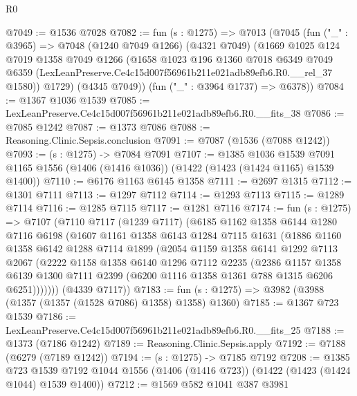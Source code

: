 \begin{lexlean}{R0}
\begin{coremodule}
@7049 := @1536 @7028
@7082 := fun (s : @1275) =>
  @7013
    (@7045
      (fun ("_" : @3965) =>
      @7048
        (@1240 @7049 @1266)
        (@4321 @7049)
        (@1669
          @1025
          @124
          @7019
          @1358
          @7049
          @1266
          (@1658
            @1023
            @196
            @1360
            @7018
            @6349
            @7049
            @6359
            (LexLeanPreserve.Ce4c15d007f56961b211e021adb89efb6.R0.__rel_37 @1580))
          @1729)
        (@4345 @7049))
      (fun ("_" : @3964 @1737) => @6378))
@7084 := @1367 @1036 @1539
@7085 := LexLeanPreserve.Ce4c15d007f56961b211e021adb89efb6.R0.__fits_38
@7086 := @7085 @1242
@7087 := @1373 @7086
@7088 := Reasoning.Clinic.Sepsis.conclusion
@7091 := @7087 (@1536 (@7088 @1242))
@7093 := (s : @1275) -> @7084 @7091
@7107 := @1385
    @1036
    @1539
    @7091
    @1165
    @1556
    (@1406 (@1416 @1036))
    (@1422 (@1423 (@1424 @1165) @1539 @1400))
@7110 := @6176 @1163 @6145 @1358
@7111 := @2697 @1315
@7112 := @1301 @7111
@7113 := @1297 @7112
@7114 := @1293 @7113
@7115 := @1289 @7114
@7116 := @1285 @7115
@7117 := @1281 @7116
@7174 := fun (s : @1275) =>
  @7107
    (@7110
      @7117
      (@1239 @7117)
      (@6185
        @1162
        @1358
        @6144
        @1280
        @7116
        @6198
        (@1607
          @1161
          @1358
          @6143
          @1284
          @7115
          @1631
          (@1886
            @1160
            @1358
            @6142
            @1288
            @7114
            @1899
            (@2054
              @1159
              @1358
              @6141
              @1292
              @7113
              @2067
              (@2222
                @1158
                @1358
                @6140
                @1296
                @7112
                @2235
                (@2386
                  @1157
                  @1358
                  @6139
                  @1300
                  @7111
                  @2399
                  (@6200 @1116 @1358 @1361 @788 @1315 @6206 @6251)))))))
      (@4339 @7117))
@7183 := fun (s : @1275) => @3982 (@3988 (@1357 (@1357 (@1528 @7086) @1358) @1358) @1360)
@7185 := @1367 @723 @1539
@7186 := LexLeanPreserve.Ce4c15d007f56961b211e021adb89efb6.R0.__fits_25
@7188 := @1373 (@7186 @1242)
@7189 := Reasoning.Clinic.Sepsis.apply
@7192 := @7188 (@6279 (@7189 @1242))
@7194 := (s : @1275) -> @7185 @7192
@7208 := @1385
    @723
    @1539
    @7192
    @1044
    @1556
    (@1406 (@1416 @723))
    (@1422 (@1423 (@1424 @1044) @1539 @1400))
@7212 := @1569 @582 @1041 @387 @3981

\end{coremodule}
\end{lexlean}
